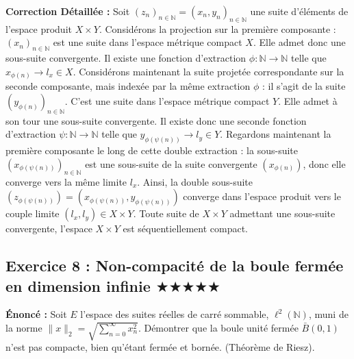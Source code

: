 \documentclass[11pt,a4paper]{article}
\begin{document}
\textbf{Correction Détaillée :}
Soit $(z_n)_{n \in \mathbb{N}} = (x_n, y_n)_{n \in \mathbb{N}}$ une suite d'éléments de l'espace produit $X \times Y$.
Considérons la projection sur la première composante : $(x_n)_{n \in \mathbb{N}}$ est une suite dans l'espace métrique compact $X$.
Elle admet donc une sous-suite convergente. Il existe une fonction d'extraction $\phi : \mathbb{N} \to \mathbb{N}$ telle que $x_{\phi(n)} \to l_x \in X$.
Considérons maintenant la suite projetée correspondante sur la seconde composante, mais indexée par la même extraction $\phi$ : il s'agit de la suite $(y_{\phi(n)})_{n \in \mathbb{N}}$.
C'est une suite dans l'espace métrique compact $Y$. Elle admet à son tour une sous-suite convergente.
Il existe donc une seconde fonction d'extraction $\psi : \mathbb{N} \to \mathbb{N}$ telle que $y_{\phi(\psi(n))} \to l_y \in Y$.
Regardons maintenant la première composante le long de cette double extraction : la sous-suite $(x_{\phi(\psi(n))})_{n \in \mathbb{N}}$ est une sous-suite de la suite convergente $(x_{\phi(n)})$, donc elle converge vers la même limite $l_x$.
Ainsi, la double sous-suite $(z_{\phi(\psi(n))}) = (x_{\phi(\psi(n))}, y_{\phi(\psi(n))})$ converge dans l'espace produit vers le couple limite $(l_x, l_y) \in X \times Y$.
Toute suite de $X \times Y$ admettant une sous-suite convergente, l'espace $X \times Y$ est séquentiellement compact.

\subsection*{Exercice 8 : Non-compacité de la boule fermée en dimension infinie \quad $\bigstar\bigstar\bigstar\bigstar\bigstar$}

\textbf{Énoncé :} Soit $E$ l'espace des suites réelles de carré sommable, $\ell^2(\mathbb{N})$, muni de la norme $\|x\|_2 = \sqrt{\sum_{n=0}^\infty x_n^2}$. Démontrer que la boule unité fermée $\bar{B}(0, 1)$ n'est pas compacte, bien qu'étant fermée et bornée. (Théorème de Riesz).
\end{document}
